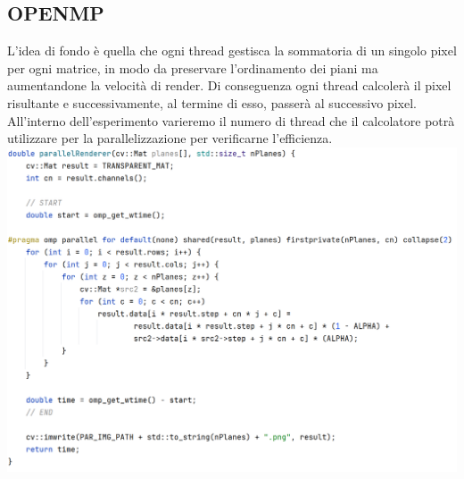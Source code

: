 \documentclass[11pt]{article}
\begin{document}
    \subsection{OPENMP}\label{subsec:openmp}
    L'idea di fondo è quella che ogni thread gestisca la sommatoria di un singolo pixel per ogni matrice, in
    modo da preservare l'ordinamento dei piani ma aumentandone la velocità di render.
    Di conseguenza ogni thread calcolerà il pixel risultante e successivamente, al termine di esso, passerà
    al successivo pixel.
    All'interno dell'esperimento varieremo il numero di thread che il calcolatore potrà utilizzare per la
    parallelizzazione per verificarne l'efficienza.
    \includegraphics[width=\textwidth]{../documentation/img/code (2)}
\end{document}
